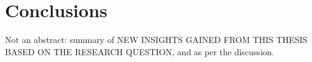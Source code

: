 \chapter{Conclusions}
\label{ch:conclusion}

Not an abstract: summary of NEW INSIGHTS GAINED FROM THIS THESIS BASED ON THE RESEARCH QUESTION, and as per the discussion.
